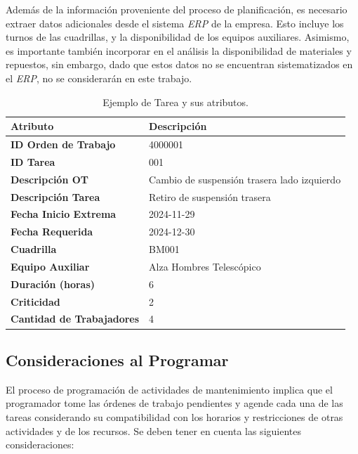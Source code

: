 \documentclass{article}
\begin{document}
Además de la información proveniente del proceso de planificación, es necesario extraer datos adicionales desde el sistema \textit{ERP} de la empresa. Esto incluye los turnos de las cuadrillas, y la disponibilidad de los equipos auxiliares. Asimismo, es importante también incorporar en el análisis la disponibilidad de materiales y repuestos, sin embargo, dado que estos datos no se encuentran sistematizados en el \textit{ERP}, no se considerarán en este trabajo.


\begin{table}[htbp]
    \centering
    \captionsetup{justification=centering}
    \vspace{0.5cm}
    \begin{tabular}{p{6cm} p{8cm}}
        \toprule
        \textbf{Atributo} & \textbf{Descripción} \\
        \midrule
        \textbf{ID Orden de Trabajo} & 4000001 \\
        \textbf{ID Tarea} & 001 \\
        \textbf{Descripción OT} & Cambio de suspensión trasera lado izquierdo \\
        \textbf{Descripción Tarea} & Retiro de suspensión trasera \\
        \textbf{Fecha Inicio Extrema} & 2024-11-29 \\
        \textbf{Fecha Requerida} & 2024-12-30 \\
        \textbf{Cuadrilla} & BM001 \\
        \textbf{Equipo Auxiliar} & Alza Hombres Telescópico \\
        \textbf{Duración (horas)} & 6 \\
        \textbf{Criticidad} & 2 \\
        \textbf{Cantidad de Trabajadores} & 4 \\
        \bottomrule
    \end{tabular}
    \caption{Ejemplo de Tarea y sus atributos.}
    \label{table:task}
\end{table}


\subsection{Consideraciones al Programar}
El proceso de programación de actividades de mantenimiento implica que el programador tome las órdenes de trabajo pendientes y agende cada una de las tareas considerando su compatibilidad con los horarios y restricciones de otras actividades y de los recursos. Se deben tener en cuenta las siguientes consideraciones:
\end{document}
